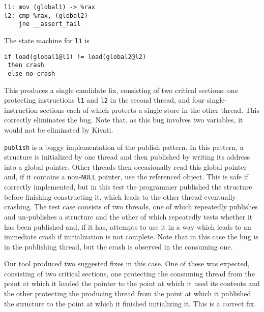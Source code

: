 \documentclass[10pt,letter,twocolumn]{sigplanconf}
\begin{document}
\begin{verbatim}
l1: mov (global1) -> %rax
l2: cmp %rax, (global2)
    jne __assert_fail
\end{verbatim}

The state machine for \verb|l1| is

\begin{verbatim}
if load(global1@l1) != load(global2@l2)
 then crash
 else no-crash
\end{verbatim}

\noindent
This produces a single candidate fix, consisting of two critical
sections: one protecting instructions \verb|l1| and \verb|l2| in the
second thread, and four single-instruction sections each of which
protects a single store in the other thread.  This correctly
eliminates the bug.  Note that, as this bug involves two variables, it
would not be eliminated by Kivati\cite{Chew2010a}.

\verb|publish| is a buggy implementation of the publish pattern.  In
this pattern, a structure is initialized by one thread and then
published by writing its address into a global pointer.  Other threads
then occasionally read this global pointer and, if it contains a
non-\verb|NULL| pointer, use the referenced object.  This is safe if
correctly implemented, but in this test the programmer published the
structure before finishing constructing it, which leads to the other
thread eventually crashing.  The test case consists of two threads,
one of which repeatedly publishes and un-publishes a structure and the
other of which repeatedly tests whether it has been published and, if
it has, attempts to use it in a way which leads to an immediate crash
if initialization is not complete.  Note that in this case the bug is
in the publishing thread, but the crash is observed in the consuming
one.

Our tool produced two suggested fixes in this case.  One of these was
expected, consisting of two critical sections, one protecting the
consuming thread from the point at which it loaded the pointer to the
point at which it used its contents and the other protecting the
producing thread from the point at which it published the structure to
the point at which it finished initializing it.  This is a correct
fix.
\end{document}
